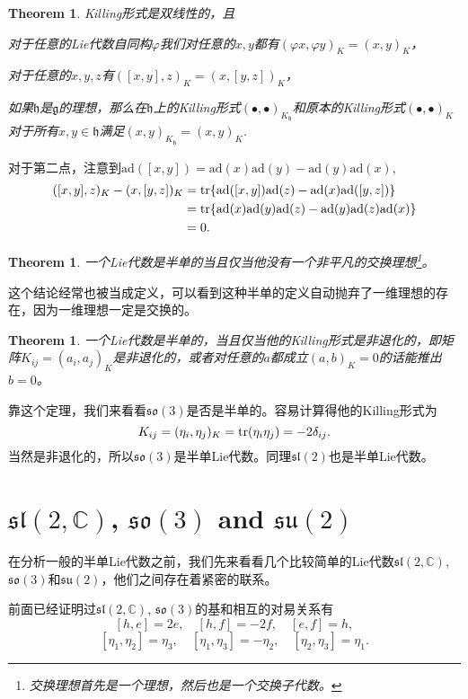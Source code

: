 \documentclass[9pt]{extbook}
\theoremstyle{plain}
\newtheorem{theo}[defi]{Theorem}
\newcommand{\cc}{\mathbb{C}}
\newcommand{\lag}{{\mathfrak{g}}}  %
\newcommand{\ad}{{\mathrm{ad}}}
\begin{document}
\begin{theo}
Killing形式是双线性的，且

对于任意的Lie代数自同构$\varphi$我们对任意的$x,y$都有$(\varphi x,\varphi y)_K=(x,y)_K$，

对于任意的$x,y,z$有$([x,y],z)_K=(x,[y,z])_K$，

如果$\mathfrak{h}$是$\lag$的理想，那么在$\mathfrak{h}$上的Killing形式$(\bullet,\bullet)_{K_\mathfrak{h}}$和原本的Killing形式$(\bullet,\bullet)_{K}$对于所有$x,y\in \mathfrak{h}$满足$(x,y)_{K_\mathfrak{h}}=(x,y)_K$.
\end{theo}

对于第二点，注意到$\ad([x,y])=\ad(x)\ad(y)-\ad(y)\ad(x)$,
\[
	\begin{split}
		([x,y],z)_K-(x,[y,z])_K&=\tr\{\ad([x,y])\ad(z)-\ad(x)\ad([y,z])\}\\
		&=\tr\{\ad(x)\ad(y)\ad(z)-\ad(y)\ad(z)\ad(x)\}\\
		&=0.
	\end{split}
\]

\begin{theo}
一个Lie代数是半单的当且仅当他没有一个非平凡的交换理想\footnote{交换理想首先是一个理想，然后也是一个交换子代数。}。
\end{theo}
这个结论经常也被当成定义，可以看到这种半单的定义自动抛弃了一维理想的存在，因为一维理想一定是交换的。

\begin{theo}
一个Lie代数是半单的，当且仅当他的Killing形式是非退化的，即矩阵$K_{ij}=(a_i,a_j)_K$是非退化的，或者对任意的$a$都成立$(a,b)_K=0$的话能推出$b=0$。
\end{theo}

靠这个定理，我们来看看$\mathfrak{so}(3)$是否是半单的。容易计算得他的Killing形式为
\[
	K_{ij}=(\eta_i,\eta_j)_K=\operatorname{tr}(\eta_i\eta_j)=-2\delta_{ij}.
\]
当然是非退化的，所以$\mathfrak{so}(3)$是半单Lie代数。同理$\mathfrak{sl}(2)$也是半单Lie代数。

\section{$\mathfrak{sl}(2,\cc)$, $\mathfrak{so}(3)$ and $\mathfrak{su}(2)$}
在分析一般的半单Lie代数之前，我们先来看看几个比较简单的Lie代数$\mathfrak{sl}(2,\cc)$, $\mathfrak{so}(3)$和$\mathfrak{su}(2)$，他们之间存在着紧密的联系。

前面已经证明过$\mathfrak{sl}(2,\cc)$, $\mathfrak{so}(3)$的基和相互的对易关系有
\[
[h,e]=2e,\quad[h,f]=-2f,\quad[e,f]=h,
\]
\[
	[\eta_1,\eta_2]=\eta_3,\quad [\eta_1,\eta_3]=-\eta_2,\quad [\eta_2,\eta_3]=\eta_1.
\]
\end{document}

